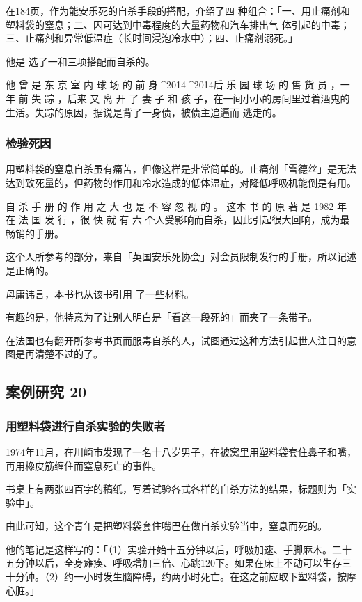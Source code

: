 \documentclass[UTF8]{ctexart}
\begin{document}
在184页，作为能安乐死的自杀手段的搭配，介绍了四 种组合：「一、用止痛剂和塑料袋的窒息；二、因可达到中毒程度的大量药物和汽车排出气 体引起的中毒；三、止痛剂和异常低温症（长时间浸泡冷水中）；四、止痛剂溺死。」

他是 选了一和三项搭配而自杀的。 

他 曾 是 东 京 室 内 球 场 的 前 身^^^^2014^^^^2014后 乐 园 球 场 的 售 货 员 ，一 年 前 失 踪 ，后来 又 离 开 了 妻 子 和 孩 子，在一间小小的房间里过着酒鬼的生活。失踪的原因，据说是背了一身债，被债主追逼而 逃走的。

\subsubsection*{检验死因}

用塑料袋的窒息自杀虽有痛苦，但像这样是非常简单的。止痛剂「雪德丝」是无法达到致死量的，但药物的作用和冷水造成的低体温症，对降低呼吸机能倒是有用。

自 杀 手 册 的 作 用 之 大 也 是 不 容 忽 视 的 。
这本 书 的 原 著 是 1982 年 在 法 国 发 行 ，很 快 就 有 六 个人受影响而自杀，因此引起很大回响，成为最畅销的手册。

这个人所参考的部分，来自「英国安乐死协会」对会员限制发行的手册，所以记述是正确的。

母庸讳言，本书也从该书引用 了一些材料。 

有趣的是，他特意为了让别人明白是「看这一段死的」而夹了一条带子。

在法国也有翻开所参考书页而服毒自杀的人，试图通过这种方法引起世人注目的意图是再清楚不过的了。

\subsection{案例研究 20}

\subsubsection*{用塑料袋进行自杀实验的失败者}

1974年11月，在川崎市发现了一名十八岁男子，在被窝里用塑料袋套住鼻子和嘴，再用橡皮筋缠住而窒息死亡的事件。

书桌上有两张四百字的稿纸，写着试验各式各样的自杀方法的结果，标题则为「实验中」。

由此可知，这个青年是把塑料袋套住嘴巴在做自杀实验当中，窒息而死的。

他的笔记是这样写的：「（1）实验开始十五分钟以后，呼吸加速、手脚麻木。二十五分钟以后，全身瘫痪、呼吸增加三倍、心跳$120$下。如果在床上不动可以生存三十分钟。（2）约一小时发生脑障碍，约两小时死亡。在这之前应取下塑料袋，按摩心脏。」
\end{document}

